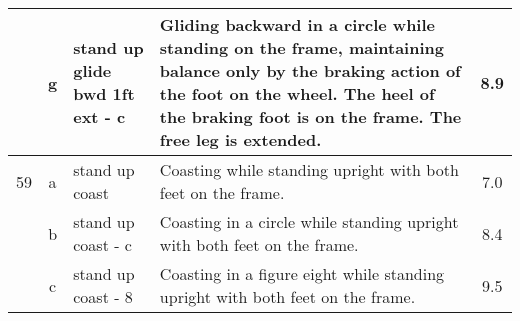 \begin{longtable}{|r|c|p{4cm}|p{8cm}|c|}
\hline
  & g & stand up glide bwd 1ft ext - c  & Gliding backward in a circle while standing on the frame, maintaining balance only by the braking action of the foot on the wheel. The heel of the braking foot is on the frame. The free leg is extended.  & 8.9 \\ 
\hline
59  & a & stand up coast  & Coasting while standing upright with both feet on the frame.  & 7.0 \\ 
\hline
  & b & stand up coast - c  & Coasting in a circle while standing upright with both feet on the frame.  & 8.4 \\ 
\hline
  & c & stand up coast - 8  & Coasting in a figure eight while standing upright with both feet on the frame.  & 9.5 \\ 
\hline
\end{longtable}


